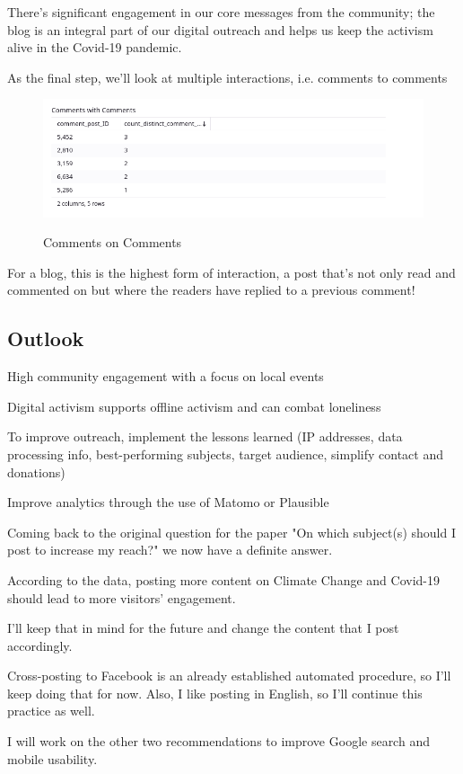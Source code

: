 There's significant engagement in our core messages from the community; the blog is an integral part of our digital outreach and helps us keep the activism alive in the Covid-19 pandemic.

As the final step, we'll look at multiple interactions, i.e. comments to comments

\begin{figure}[H]
\centering
\caption {Comments on Comments}
\includegraphics[width=\linewidth]{images/figure19.png}
\label{fig:commentsComment}
\end{figure}

For a blog, this is the highest form of interaction, a post that's not only read and commented on but where the readers have replied to a previous comment! 

\subsection{Outlook}

High community engagement with a focus on local events

Digital activism supports offline activism and can combat loneliness

To improve outreach, implement the lessons learned (IP addresses, data processing info, best-performing subjects, target audience, simplify contact and donations)

Improve analytics through the use of Matomo or Plausible

Coming back to the original question for the paper "On which subject(s) should I post to increase my reach?" we now have a definite answer.

According to the data, posting more content on Climate Change and Covid-19 should lead to more visitors' engagement.

I'll keep that in mind for the future and change the content that I post accordingly.

Cross-posting to Facebook is an already established automated procedure, so I'll keep doing that for now. Also, I like posting in English, so I'll continue this practice as well.

I will work on the other two recommendations to improve Google search and mobile usability.

